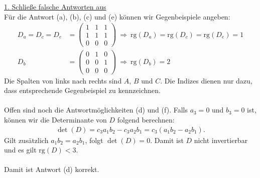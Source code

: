 \underline{1. Schließe falsche Antworten aus}\\
Für die Antwort (a), (b), (c) und (e) können wir Gegenbeispiele angeben:
\begin{align*}
	D_a = D_c = D_e
	&=
	\begin{pmatrix}
		1 & 1  & 1\\
		1 & 1 & 1\\
		0 & 0 & 0
	\end{pmatrix}
	\ \Rightarrow \
	\mathrm{rg}(D_a) = \mathrm{rg}(D_c) = \mathrm{rg}(D_e) = 1\\
	D_b
	&=
	\begin{pmatrix}
		0 & 1  & 0 \\
		0 & 0 & 1\\
		0 & 0 & 0
	\end{pmatrix}
	\ \Rightarrow \
	\mathrm{rg}(D_b) = 2
\end{align*}
Die Spalten von links nach rechts sind $A$, $B$ und $C$. Die Indizes dienen nur dazu, dass entsprechende Gegenbeispiel zu kennzeichnen.\\
\\
Offen sind noch die Antwortmöglichkeiten (d) und (f). 
Falls $a_3 = 0 $ und $b_3 = 0 $ ist, können wir die Determinante von $D$ folgend berechnen:
\begin{align*}
	\det(D) = c_3 a_1 b_2 - c_3 a_2 b_1
	= c_3 ( a_1 b_2 - a_2 b_1).
\end{align*}
Gilt zusätzlich $a_1 b_2 = a_2 b_1$, folgt $\det(D) = 0$. Damit ist $D$ nicht invertierbar und es gilt $\mathrm{rg}(D) < 3$.\\
\\
Damit ist Antwort (d) korrekt.



\newpage
